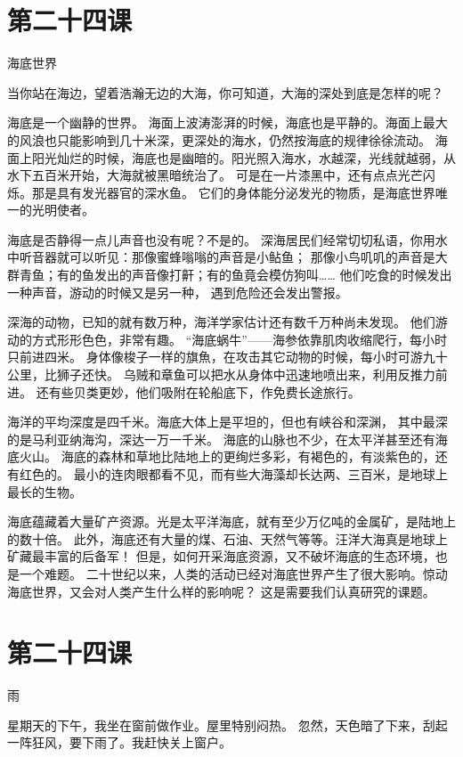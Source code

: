 \documentclass[12pt,UTF8]{ctexbook}
\begin{document}
\section{第二十四课}

海底世界

当你站在海边，望着浩瀚无边的大海，你可知道，大海的深处到底是怎样的呢？

海底是一个幽静的世界。
海面上波涛澎湃的时候，海底也是平静的。海面上最大的风浪也只能影响到几十米深，更深处的海水，仍然按海底的规律徐徐流动。
海面上阳光灿烂的时候，海底也是幽暗的。阳光照入海水，水越深，光线就越弱，从水下五百米开始，大海就被黑暗统治了。
可是在一片漆黑中，还有点点光芒闪烁。那是具有发光器官的深水鱼。
它们的身体能分泌发光的物质，是海底世界唯一的光明使者。

海底是否静得一点儿声音也没有呢？不是的。
深海居民们经常切切私语，你用水中听音器就可以听见：那像蜜蜂嗡嗡的声音是小鲇鱼；
那像小鸟叽叽的声音是大群青鱼；有的鱼发出的声音像打鼾；有的鱼竟会模仿狗叫……
他们吃食的时候发出一种声音，游动的时候又是另一种，
遇到危险还会发出警报。

深海的动物，已知的就有数万种，海洋学家估计还有数千万种尚未发现。
他们游动的方式形形色色，非常有趣。
“海底蜗牛”——海参依靠肌肉收缩爬行，每小时只前进四米。
身体像梭子一样的旗魚，在攻击其它动物的时候，每小时可游九十公里，比狮子还快。
乌贼和章鱼可以把水从身体中迅速地喷出来，利用反推力前进。
还有些贝类更妙，他们吸附在轮船底下，作免费长途旅行。

海洋的平均深度是四千米。海底大体上是平坦的，但也有峡谷和深渊，
其中最深的是马利亚纳海沟，深达一万一千米。
海底的山脉也不少，在太平洋甚至还有海底火山。
海底的森林和草地比陆地上的更绚烂多彩，有褐色的，有淡紫色的，还有红色的。
最小的连肉眼都看不见，而有些大海藻却长达两、三百米，是地球上最长的生物。

海底蕴藏着大量矿产资源。光是太平洋海底，就有至少万亿吨的金属矿，是陆地上的数十倍。
此外，海底还有大量的煤、石油、天然气等等。汪洋大海真是地球上矿藏最丰富的后备军！
但是，如何开采海底资源，又不破坏海底的生态环境，也是一个难题。
二十世纪以来，人类的活动已经对海底世界产生了很大影响。惊动海底世界，又会对人类产生什么样的影响呢？
这是需要我们认真研究的课题。

\section{第二十四课}

雨

星期天的下午，我坐在窗前做作业。屋里特别闷热。
忽然，天色暗了下来，刮起一阵狂风，要下雨了。我赶快关上窗户。
\end{document}
